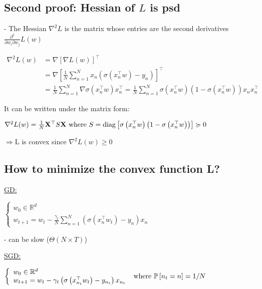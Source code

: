 \subsection*{Second proof: Hessian of $L$ is psd}
- The Hessian $\nabla^{2} L$ is the matrix whose entries are the second derivatives $\frac{\partial^{2}}{\partial w_{i} \partial w_{j}} L(w)$

$
\begin{aligned}
\nabla^{2} L(w) & =\nabla[\nabla L(w)]^{\top} \\
& =\nabla\left[\frac{1}{N} \sum_{n=1}^{N} x_{n}\left(\sigma\left(x_{n}^{\top} w\right)-y_{n}\right)\right]^{\top} \\
& =\frac{1}{N} \sum_{n=1}^{N} \nabla \sigma\left(x_{n}^{\top} w\right) x_{n}^{\top}=\frac{1}{N} \sum_{n=1}^{N} \sigma\left(x_{n}^{\top} w\right)\left(1-\sigma\left(x_{n}^{\top} w\right)\right) x_{n} x_{n}^{\top}
\end{aligned}
$

It can be written under the matrix form:

$
\nabla^{2} L(w)=\frac{1}{N} \mathbf{X}^{\top} S \mathbf{X} \\ \text { where } S=\operatorname{diag}\left[\sigma\left(x_{n}^{\top} w\right)\left(1-\sigma\left(x_{n}^{\top} w\right)\right)\right] \succcurlyeq 0
$

$\Rightarrow \mathrm{L}$ is convex since $\nabla^{2} L(w) \geqslant 0$

\subsection*{How to minimize the convex function L?}
\underline{GD:}

$
\left\{\begin{array}{l}
w_{0} \in \mathbb{R}^{d} \\
w_{t+1}=w_{t}-\frac{\gamma_{t}}{N} \sum_{n=1}^{N}\left(\sigma\left(x_{n}^{\top} w_{t}\right)-y_{n}\right) x_{n}
\end{array}\right.
$

- can be slow ($\Theta(N\times T)$)

\underline{SGD:}

$
\left\{\begin{array}{l}
w_{0} \in \mathbb{R}^{d} \\
w_{t+1}=w_{t}-\gamma_{t}\left(\sigma\left(x_{n_{t}}^{\top} w_{t}\right)-y_{n_{t}}\right) x_{n_{t}}
\end{array}\right. \\ \text { where } \mathbb{P}\left[n_{t}=n\right]=1 / N
$

